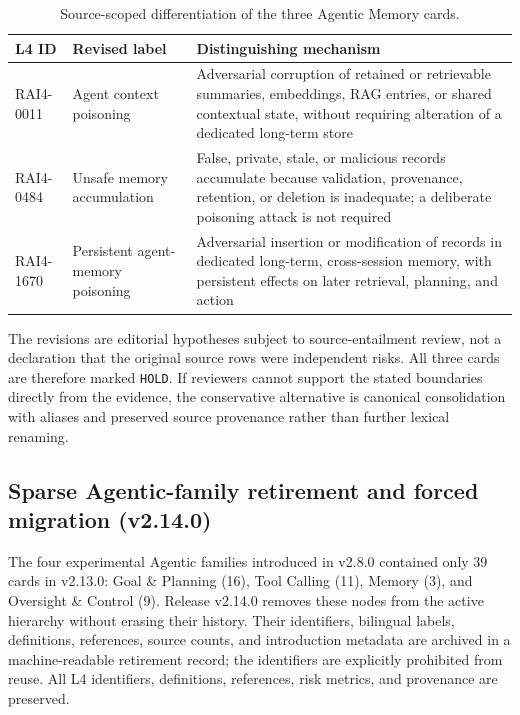 \documentclass[11pt,a4paper]{article}
\newcommand{\code}[1]{\texttt{#1}}
\begin{document}
\begin{appendices}
\begin{table}[H]
\centering
\caption{Source-scoped differentiation of the three Agentic Memory cards.}
\small
\begin{tabularx}{\textwidth}{p{1.9cm} p{3.7cm} X}
\toprule
L4 ID & Revised label & Distinguishing mechanism \\
\midrule
RAI4-0011 & Agent context poisoning & Adversarial corruption of retained or
retrievable summaries, embeddings, RAG entries, or shared contextual state,
without requiring alteration of a dedicated long-term store \\
RAI4-0484 & Unsafe memory accumulation & False, private, stale, or malicious
records accumulate because validation, provenance, retention, or deletion is
inadequate; a deliberate poisoning attack is not required \\
RAI4-1670 & Persistent agent-memory poisoning & Adversarial insertion or
modification of records in dedicated long-term, cross-session memory, with
persistent effects on later retrieval, planning, and action \\
\bottomrule
\end{tabularx}
\end{table}

The revisions are editorial hypotheses subject to source-entailment review,
not a declaration that the original source rows were independent risks. All
three cards are therefore marked \code{HOLD}. If reviewers cannot support the
stated boundaries directly from the evidence, the conservative alternative is
canonical consolidation with aliases and preserved source provenance rather
than further lexical renaming.

\subsection{Sparse Agentic-family retirement and forced migration (v2.14.0)}

The four experimental Agentic families introduced in v2.8.0 contained only 39
cards in v2.13.0: Goal \& Planning (16), Tool Calling (11), Memory (3), and
Oversight \& Control (9). Release v2.14.0 removes these nodes from the active
hierarchy without erasing their history. Their identifiers, bilingual labels,
definitions, references, source counts, and introduction metadata are archived
in a machine-readable retirement record; the identifiers are explicitly
prohibited from reuse. All L4 identifiers, definitions, references, risk
metrics, and provenance are preserved.


\end{appendices}
\end{document}
